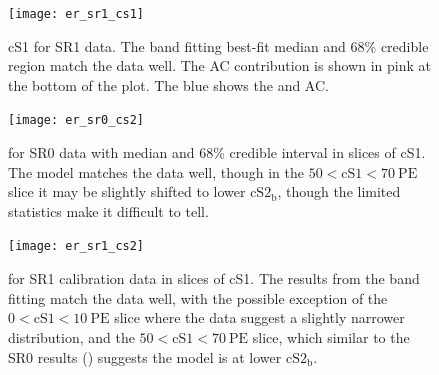 \begin{figure}
\centering
\texttt{[image: er\_sr1\_cs1]}
\caption{cS1 for SR1  data.  The band fitting best-fit median and 68\% credible region match the data well.  The AC
contribution is shown in pink at the bottom of the plot.  The blue shows the  and AC.}
\label{fig:er_nr_calibrations_results_er_sr1_cs1}
\end{figure}

\begin{figure}
\centering
\texttt{[image: er\_sr0\_cs2]}
\caption{\cstwob for SR0  data with median and 68\% credible interval in slices of cS1.  The model matches the data well,
though in the $50 < \mathrm{cS1} < 70\ \mathrm{PE}$ slice it may be slightly shifted to lower $\mathrm{cS2_b}$, though the limited
statistics make it difficult to tell.}
\label{fig:er_nr_calibrations_results_er_sr0_cs2}
\end{figure}

\begin{figure}
\centering
\texttt{[image: er\_sr1\_cs2]}
\caption{\cstwob for SR1  calibration data in slices of cS1.  The results from the band fitting match the data well, with the
possible exception of the $0 < \mathrm{cS1} < 10\ \mathrm{PE}$ slice where the data suggest a slightly narrower distribution, and the
$50 < \mathrm{cS1} < 70\ \mathrm{PE}$ slice,
which similar to the SR0 results () suggests the model is at lower
$\mathrm{cS2_b}$.}
\label{fig:er_nr_calibrations_results_er_sr1_cs2}
\end{figure}

